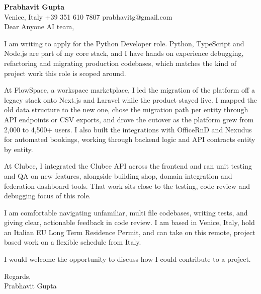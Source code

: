 \documentclass[a4paper,10.5pt]{article}
\begin{document}
\textbf{Prabhavit Gupta}\\
Venice, Italy \textbar{} +39 351 610 7807 \textbar{} prabhavitg@gmail.com\\[10pt]
Dear Anyone AI team,

I am writing to apply for the Python Developer role. Python, TypeScript and Node.js are part of my core stack, and I have hands on experience debugging, refactoring and migrating production codebases, which matches the kind of project work this role is scoped around.

At FlowSpace, a workspace marketplace, I led the migration of the platform off a legacy stack onto Next.js and Laravel while the product stayed live. I mapped the old data structure to the new one, chose the migration path per entity through API endpoints or CSV exports, and drove the cutover as the platform grew from 2,000 to 4,500+ users. I also built the integrations with OfficeRnD and Nexudus for automated bookings, working through backend logic and API contracts entity by entity.

At Clubee, I integrated the Clubee API across the frontend and ran unit testing and QA on new features, alongside building shop, domain integration and federation dashboard tools. That work sits close to the testing, code review and debugging focus of this role.

I am comfortable navigating unfamiliar, multi file codebases, writing tests, and giving clear, actionable feedback in code review. I am based in Venice, Italy, hold an Italian EU Long Term Residence Permit, and can take on this remote, project based work on a flexible schedule from Italy.

I would welcome the opportunity to discuss how I could contribute to a project.

Regards,\\
Prabhavit Gupta
\end{document}

